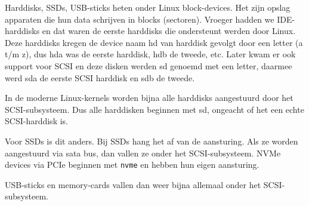 Harddisks, SSDs, USB-sticks heten onder Linux block-devices. Het zijn opslag apparaten die hun data schrijven in blocks (sectoren). Vroeger hadden we IDE-harddisks en dat waren de eerste harddisks die ondersteunt werden door Linux. Deze harddisks kregen de device naam hd van harddisk gevolgt door een letter (a t/m z), dus hda was de eerste harddisk, hdb de tweede, etc. Later kwam er ook support voor SCSI en deze disken werden sd genoemd met een letter, daarmee werd sda de eerste SCSI harddisk en sdb de tweede.

In de moderne Linux-kernels worden bijna alle harddisks aangestuurd door het SCSI-subsysteem. Dus alle harddisken beginnen met sd, ongeacht of het een echte SCSI-harddisk is.

Voor SSDs is dit anders. Bij SSDs hang het af van de aansturing. Als ze worden aangestuurd via sata bus, dan vallen ze onder het SCSI-subsysteem. NVMe devices via PCIe beginnen met \texttt{nvme} en hebben hun eigen aansturing.

USB-sticks en memory-cards vallen dan weer bijna allemaal onder het SCSI-subsysteem.

